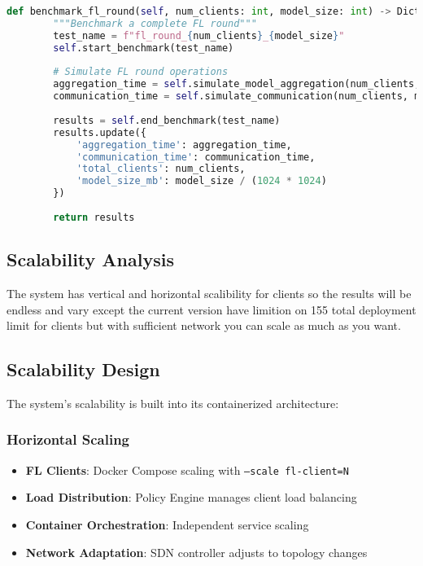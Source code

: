 \begin{lstlisting}[language=python, caption=FL Round Benchmarking]
    def benchmark_fl_round(self, num_clients: int, model_size: int) -> Dict:
        """Benchmark a complete FL round"""
        test_name = f"fl_round_{num_clients}_{model_size}"
        self.start_benchmark(test_name)
        
        # Simulate FL round operations
        aggregation_time = self.simulate_model_aggregation(num_clients, model_size)
        communication_time = self.simulate_communication(num_clients, model_size)
        
        results = self.end_benchmark(test_name)
        results.update({
            'aggregation_time': aggregation_time,
            'communication_time': communication_time,
            'total_clients': num_clients,
            'model_size_mb': model_size / (1024 * 1024)
        })
        
        return results
\end{lstlisting}

\subsection{Scalability Analysis}
The system has vertical and horizontal scalibility for clients so the results will be endless and vary except the current version have limition on 155 total deployment limit for clients but with sufficient network you can scale as much as you want.

\subsection{Scalability Design}

The system's scalability is built into its containerized architecture:

\subsubsection{Horizontal Scaling}
\begin{itemize}
    \item \textbf{FL Clients}: Docker Compose scaling with \texttt{--scale fl-client=N}
    \item \textbf{Load Distribution}: Policy Engine manages client load balancing
    \item \textbf{Container Orchestration}: Independent service scaling
    \item \textbf{Network Adaptation}: SDN controller adjusts to topology changes
\end{itemize}

